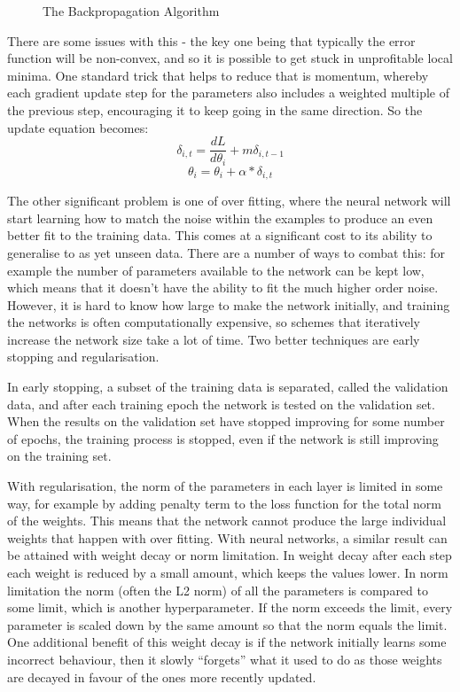 \begin{figure}
\centering

\caption{The Backpropagation Algorithm}
\label{fig:backprop}
\end{figure}

There are some issues with this - the key one being  that typically the error function will be non-convex, and so it is possible to get stuck in unprofitable local minima. One standard trick that helps to reduce that is momentum, whereby each gradient update step for the parameters also includes a weighted multiple of the previous step, encouraging it to keep going in the same direction. So the update equation becomes:
\begin{equation*}
\delta_{i,t} = \frac{dL}{d\theta_i} + m\delta_{i,t-1}
\end{equation*}
\begin{equation}
\theta_i = \theta_i  + \alpha * \delta_{i,t}
\end{equation}

The other significant problem is one of over fitting, where the neural network will start learning how to match the noise within the examples to produce an even better fit to the training data. This comes at a significant cost to its ability to generalise to as yet unseen data. There are a number of ways to combat this: for example the number of parameters available to the network can be kept low, which means that it doesn't have the ability to fit the much higher order noise. However, it is hard to know how large to make the network initially, and training the networks is often computationally expensive, so schemes that iteratively increase the network size take a lot of time. Two better techniques are early stopping and regularisation.

In early stopping, a subset of the training data is separated, called the validation data, and after each training epoch the network is tested on the validation set. When the results on the validation set have stopped improving for some number of epochs, the training process is stopped, even if the network is still improving on the training set.

With regularisation, the norm of the parameters in each layer is limited in some way, for example by adding penalty term to the loss function for the total norm of the weights. This means that the network cannot produce the large individual weights that happen with over fitting. With neural networks, a similar result can be attained with weight decay or norm limitation. In weight decay after each step each weight is reduced by a small amount, which keeps the values lower. In norm limitation the norm (often the L2 norm) of all the parameters is compared to some limit, which is another hyperparameter. If the norm exceeds the limit, every parameter is scaled down by the same amount so that the norm equals the limit. One additional benefit of this weight decay is if the network initially learns some incorrect behaviour, then it slowly ``forgets'' what it used to do as those weights are decayed in favour of the ones more recently updated.

